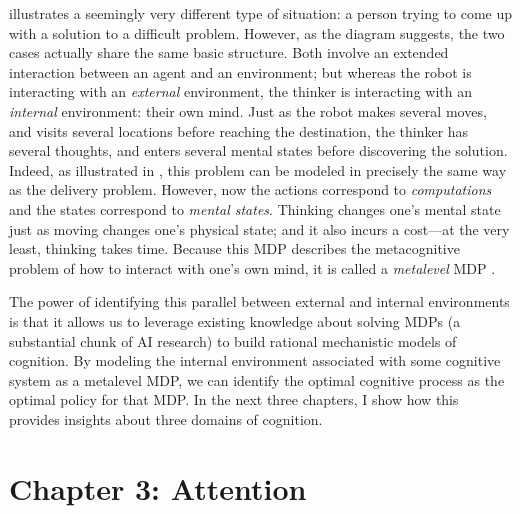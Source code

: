 \documentclass[dsingle]{memo}
\begin{document}
 illustrates a seemingly very different type of situation: a person trying to come up with a solution to a difficult problem. However, as the diagram suggests, the two cases actually share the same basic structure. Both involve an extended interaction between an agent and an environment; but whereas the robot is interacting with an \emph{external} environment, the thinker is interacting with an \emph{internal} environment: their own mind. Just as the robot makes several moves, and visits several locations before reaching the destination, the thinker has several thoughts, and enters several mental states before discovering the solution. Indeed, as illustrated in , this problem can be modeled in precisely the same way as the delivery problem. However, now the actions correspond to \emph{computations} and the states correspond to \emph{mental states}. Thinking changes one's mental state just as moving changes one's physical state; and it also incurs a cost---at the very least, thinking takes time. Because this MDP describes the metacognitive problem of how to interact with one's own mind, it is called a \emph{metalevel} MDP \citep{hay2016principles}.

The power of identifying this parallel between external and internal environments is that it allows us to leverage existing knowledge about solving MDPs (a substantial chunk of AI research) to build rational mechanistic models of cognition. By modeling the internal environment associated with some cognitive system as a metalevel MDP, we can identify the optimal cognitive process as the optimal policy for that MDP. In the next three chapters, I show how this provides insights about three domains of cognition.


\section{Chapter 3: Attention}
\end{document}
